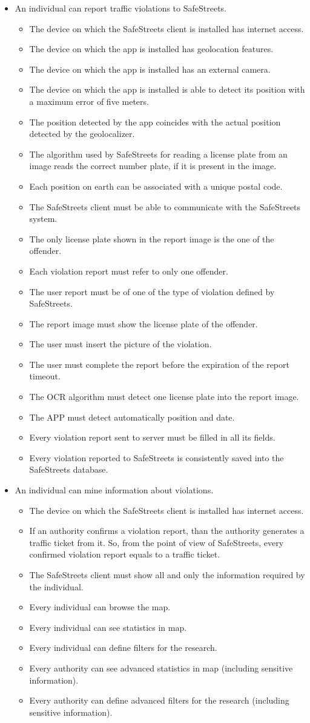 \documentclass{article}
\newcommand\goal[1]{\item[{[G#1]}] }
\newcommand\requirement[1]{\item[{[R#1]}] }
\newcommand\assumption[1]{\item[{[A#1]}] }
\begin{document}
			\begin{itemize}
				\goal{1}An individual can report traffic violations to SafeStreets.
				\begin{itemize}
					\assumption{1} The device on which the SafeStreets client is installed has internet access.
					\assumption{2} The device on which the app is installed has geolocation features.
					\assumption{3} The device on which the app is installed has an external camera.
					\assumption{4} The device on which the app is installed is able to detect its position with a maximum error of five meters.
					\assumption{5} The position detected by the app coincides with the actual position detected by the geolocalizer.
					\assumption{6} The algorithm used by SafeStreets for reading a license plate from an image reads the correct number plate, if it is present in the image.
					\assumption{7} Each position on earth can be associated with a unique postal code.
					\assumption{8} The SafeStreets client must be able to communicate with the SafeStreets system.
					\assumption{9} The only license plate shown in the report image is the one of the offender.
					\assumption{10} Each violation report must refer to only one offender.	
					\requirement{1} The user report must be of one of the type of violation defined by SafeStreets.
					\requirement{2} The report image must show the license plate of the offender.
					\requirement{3} The user must insert the picture of the violation.
					\requirement{4} The user must complete the report before the expiration of the report timeout.
					\requirement{5} The OCR algorithm must detect one license plate into the report image.
					\requirement{6} The APP must detect automatically position and date. 
					\requirement{7} Every violation report sent to server must be filled in all its fields.
					\requirement{17} Every violation reported to SafeStreets is consistently saved into the SafeStreets database.
					
				\end{itemize}
				\goal{2}An individual can mine information about violations.
				\begin{itemize}
					\assumption{1} The device on which the SafeStreets client is installed has internet access.
					\assumption{11} If an authority confirms a violation report, than the authority generates a traffic ticket from it. So, from the point of view of SafeStreets, every confirmed violation report equals to a traffic ticket.
					\requirement{8} The SafeStreets client must show all and only the information required by the individual.
					\requirement{9} Every individual can browse the map.
					\requirement{10} Every individual can see statistics in map.
					\requirement{11} Every individual can define filters for the research.
					\requirement{12} Every authority can see advanced statistics in map (including sensitive information).
					\requirement{13} Every authority can define advanced filters for the research (including sensitive information).
					

\end{itemize}
\end{itemize}
\end{document}
